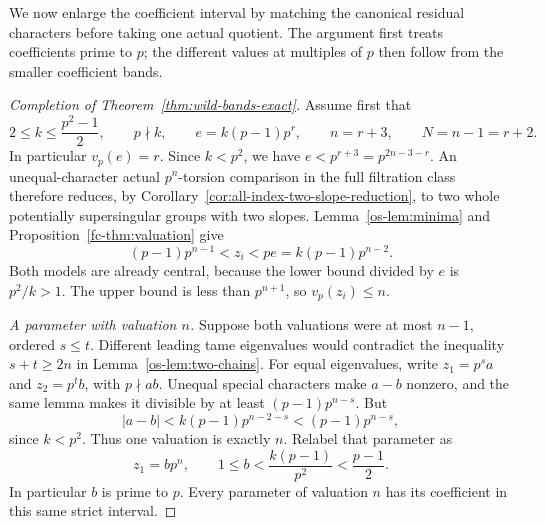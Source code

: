 We now enlarge the coefficient interval by matching the canonical
residual characters before taking one actual quotient.  The argument
first treats coefficients prime to $p$; the different values at
multiples of $p$ then follow from the smaller coefficient bands.

\begin{proof}[Completion of Theorem~\ref{thm:wild-bands-exact}]
Assume first that
\[
 2\le k\le\frac{p^2-1}{2},\qquad p\nmid k,
 \qquad e=k(p-1)p^r,
 \qquad n=r+3,\qquad N=n-1=r+2.
\]
In particular $v_p(e)=r$.  Since $k<p^2$, we have
$e<p^{r+3}=p^{2n-3-r}$.  An unequal-character actual $p^n$-torsion
comparison in the full filtration class therefore reduces, by
Corollary~\ref{cor:all-index-two-slope-reduction}, to two whole
potentially supersingular groups with two slopes.
Lemma~\ref{os-lem:minima} and Proposition~\ref{fc-thm:valuation} give
\begin{equation}\label{os-eq:half-square-range}
 (p-1)p^{n-1}<z_i<pe=k(p-1)p^{n-2}.
\end{equation}
Both models are already central, because the lower bound divided by
$e$ is $p^2/k>1$.  The upper bound is less than $p^{n+1}$, so
$v_p(z_i)\le n$.

\smallskip\noindent
\emph{A parameter with valuation $n$.}
Suppose both valuations were at most $n-1$, ordered $s\le t$.
Different leading tame eigenvalues would contradict the inequality
$s+t\ge2n$ in Lemma~\ref{os-lem:two-chains}.  For equal eigenvalues,
write $z_1=p^sa$ and $z_2=p^tb$, with $p\nmid ab$.  Unequal special
characters make $a-b$ nonzero, and the same lemma makes it divisible
by at least $(p-1)p^{n-s}$.  But
\[
 |a-b|<k(p-1)p^{n-2-s}<(p-1)p^{n-s},
\]
since $k<p^2$.  Thus one valuation is exactly $n$.  Relabel that
parameter as
\begin{equation}\label{os-eq:half-square-high}
 z_1=bp^n,
 \qquad 1\le b<\frac{k(p-1)}{p^2}<\frac{p-1}{2}.
\end{equation}
In particular $b$ is prime to $p$.  Every parameter of valuation $n$
has its coefficient in this same strict interval.


\end{proof}
